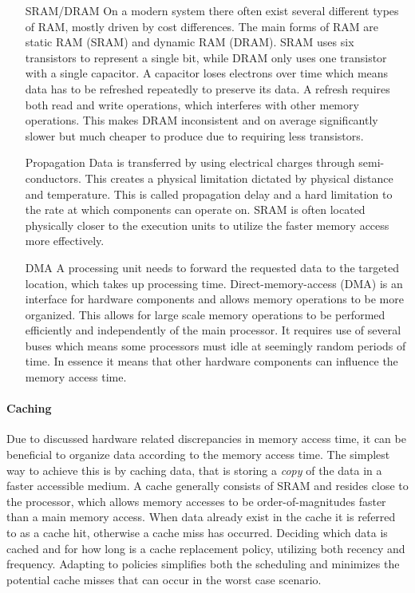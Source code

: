 \documentclass{article}
\begin{document}
\begin{itemize}
    \item [SRAM/DRAM]
    On a modern system there often exist several different types of RAM, mostly driven by cost differences.
    The main forms of RAM are static RAM (SRAM) and dynamic RAM (DRAM).
    SRAM uses six transistors to represent a single bit, while DRAM only uses one transistor with a single capacitor. 
    A capacitor loses electrons over time which means data has to be refreshed repeatedly to preserve its data.
    A refresh requires both read and write operations, which interferes with other memory operations.
    This makes DRAM inconsistent and on average significantly slower but much cheaper to produce due to requiring less transistors.\cite{memory}

    \item [Propagation]
    Data is transferred by using electrical charges through semi-conductors.
    This creates a physical limitation dictated by physical distance and temperature.
    This is called propagation delay and a hard limitation to the rate at which components can operate on.
    SRAM is often located physically closer to the execution units to utilize the faster memory access more effectively.
 
    \item [DMA]
    A processing unit needs to forward the requested data to the targeted location, which takes up processing time.
    Direct-memory-access (DMA) is an interface for hardware components and allows memory operations to be more organized.
    This allows for large scale memory operations to be performed efficiently and independently of the main processor.
    It requires use of several buses which means some processors must idle at seemingly random periods of time.
    In essence it means that other hardware components can influence the memory access time.
\end{itemize}

\newpage

\paragraph{Caching}

Due to discussed hardware related discrepancies in memory access time, it can be beneficial to organize data according to the memory access time.
The simplest way to achieve this is by caching data, that is storing a {\it copy} of the data in a faster accessible medium.
A cache generally consists of SRAM and resides close to the processor, which allows memory accesses to be order-of-magnitudes faster than a main memory access\cite{memory}.
When data already exist in the cache it is referred to as a cache hit, otherwise a cache miss has occurred.
Deciding which data is cached and for how long is a cache replacement policy, utilizing both recency and frequency.
Adapting to policies simplifies both the scheduling and minimizes the potential cache misses that can occur in the worst case scenario.
\end{document}
